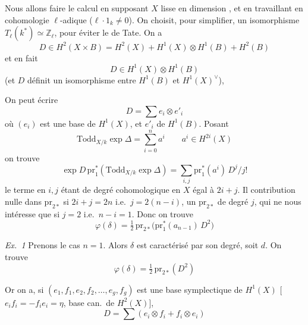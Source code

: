 \documentclass[11pt,a4paper]{article}
\begin{document}
Nous allons faire le calcul en supposant $X$ lisse en dimension \ill{}, et
en travaillant en cohomologie $\ell$-adique ($\ell \cdot 1_k \neq 0$). On
choisit, pour simplifier, un isomorphisme $T_{\ell}(k^{*}) \simeq \mathbb{Z}_{\ell}$,
pour éviter le  de Tate. On a
\[
D \in H^{2}(X \times B) = H^{2}(X) + H^{1}(X) \otimes H^{1}(B) + H^{2}(B)
\]
et en fait
\[
D \in H^{1}(X) \otimes H^{1}(B)
\]
(et $D$ définit un isomorphisme entre $H^{1}(B)$ et $H^{1}(X)^{\vee}$),


On peut écrire
\[
D = \sum e_i \otimes e'_i
\]
où $(e_i)$ est une base de $H^{1}(X)$, et $e'_i$ 
de $H^{1}(B)$. Posant
\[
\mathrm{Todd}_{X/k} \exp \Delta = \sum_{i=0}^{n} a^{i} \qquad a^{i} \in H^{2i}(X)
\]
on trouve
\[
\exp D\, \mathrm{pr}_1^{*}(\mathrm{Todd}_{X/k} \exp \Delta) = \sum_{i,j} \mathrm{pr}_1^{*}(a^{i})\, D^{j} / j!
\]
le terme en $i,j$ étant de degré cohomologique  en $X$ égal
à $2i + j$. Il  contribution nulle dans $\mathrm{pr}_{2*}$
 si $2i + j = 2n$ i.e.\ $j = 2(n-i)$, 
 un $\mathrm{pr}_{2*}$ de degré $j$, qui
ne nous intéresse que si $j = 2$ i.e.\ $n - i = 1$.  Donc on
trouve
\[
\varphi(\delta) = \tfrac{1}{2}\, \mathrm{pr}_{2*}\bigl(\mathrm{pr}_1^{*}(a_{n-1})\, D^{2}\bigr)
\]

\emph{Ex.\ 1} Prenons le cas $n = 1$. Alors $\delta$ est caractérisé par son
degré, soit \struck{\ill{}} $d$. On trouve
\[
\varphi(\delta) = \tfrac{1}{2}\, \mathrm{pr}_{2*}(D^{2})
\]

Or \ill{} on a, si $(e_1, f_1, e_2, f_2, \ldots, e_g, f_g)$ est une base
symplectique de $H^{1}(X)$ [$e_i f_i = -f_i e_i = \eta$, base can.\ de
$H^{2}(X)$],
\[
D = \sum (e_i \otimes f_i + f_i \otimes e_i)
\]

\end{document}
